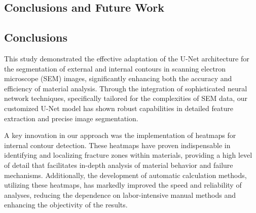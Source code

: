 \documentclass[preprint,12pt]{elsarticle}
\begin{document}
\begin{itemize}
\section{Conclusions and Future Work}
\label{Sec: Conclusions and future work}

\subsection{Conclusions}
This study demonstrated the effective adaptation of the U-Net architecture for the segmentation of external and internal contours in scanning electron microscope (SEM) images, significantly enhancing both the accuracy and efficiency of material analysis. Through the integration of sophisticated neural network techniques, specifically tailored for the complexities of SEM data, our customized U-Net model has shown robust capabilities in detailed feature extraction and precise image segmentation.

A key innovation in our approach was the implementation of heatmaps for internal contour detection. These heatmaps have proven indispensable in identifying and localizing fracture zones within materials, providing a high level of detail that facilitates in-depth analysis of material behavior and failure mechanisms. Additionally, the development of automatic calculation methods, utilizing these heatmaps, has markedly improved the speed and reliability of analyses, reducing the dependence on labor-intensive manual methods and enhancing the objectivity of the results.


\end{itemize}
\end{document}
